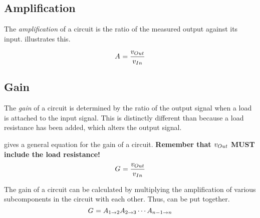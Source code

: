 \subsection{Amplification}\label{subsec:Amplification}
The \emph{amplification} of a circuit is the ratio of the measured output against its input.
 illustrates this.

\begin{equation}\label{eq:Amplification}
  \Amp{} = \frac{\ACVoltage{\Out}}{\ACVoltage{\In}}
\end{equation}

\subsection{Gain}\label{subsec:Gain}
The \emph{gain} of a circuit is determined by the ratio of the output signal when a load is attached to the input signal.
This is distinctly different than  because a load resistance has been added, which alters the output signal.

 gives a general equation for the gain of a circuit.
\textbf{Remember that $\ACVoltage{\Out}$ MUST include the load resistance!}
\begin{equation}\label{eq:Gain}
  \Gain{} = \frac{\ACVoltage{\Out}}{\ACVoltage{\In}}
\end{equation}

The gain of a circuit can be calculated by multiplying the amplification of various subcomponents in the circuit with each other.
Thus,  can be put together.
\begin{equation}\label{eq:Gain-Broken}
  G_{} = A_{1 \to 2} A_{2 \to 3} \cdots A_{n-1 \to n}
\end{equation}

